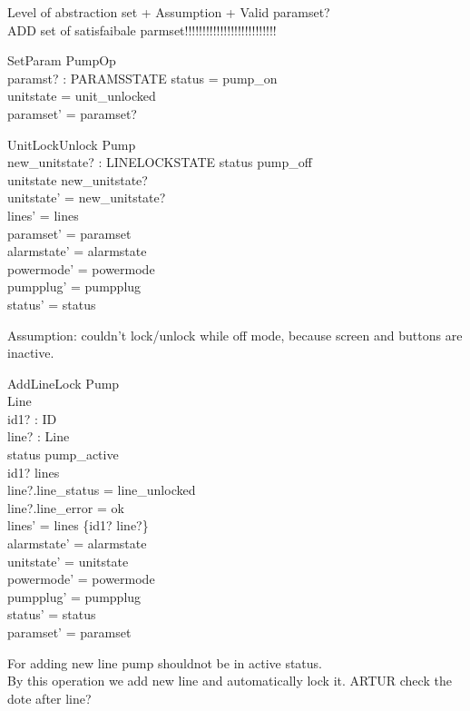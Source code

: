 \documentclass{article}
\begin{document}
	Level of abstraction set + Assumption + Valid paramset?\\
	ADD set of satisfaibale parmset!!!!!!!!!!!!!!!!!!!!!!!!!!

	\begin{schema}{SetParam}
		PumpOp \\
		paramst? : PARAMSSTATE 
	\where
		status = pump\_on \\ 
		unitstate = unit\_unlocked \\
		paramset' = paramset?
	\end{schema}

	
    \begin{schema}{UnitLockUnlock}
		\Delta Pump \\
		new\_unitstate? : LINELOCKSTATE
	\where
		status \neq pump\_off \\ 
		unitstate \neq new\_unitstate? \\
		unitstate' = new\_unitstate? \\
    	lines' = lines  \\
    	paramset' = paramset\\
    	alarmstate' = alarmstate \\
    	powermode' = powermode \\
    	pumpplug' = pumpplug \\
    	status' = status \\	
	\end{schema}
	Assumption: couldn't lock/unlock while off mode, because screen and buttons are inactive.

	

    \begin{schema}{AddLineLock}
		\Delta Pump \\
		\Delta Line \\
		id1? : ID \\
		line? : Line \\
	\where
	    status \neq pump\_active \\
		id1? \notin \dom lines \\
		line?.line\_status = line\_unlocked \\
		line?.line\_error = ok\\
    	lines' = lines \cup \{id1? \mapsto line?\} \\
    	alarmstate' = alarmstate \\
    	unitstate' = unitstate \\
    	powermode' = powermode \\
    	pumpplug' = pumpplug \\
    	status' = status \\
    	paramset' = paramset

	\end{schema}
	For adding new line pump shouldnot be in active status.\\
    By this operation we add new line and automatically lock it. ARTUR check the dote after line?
	
\end{document}
